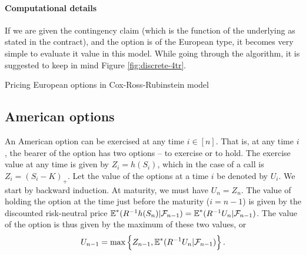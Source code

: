 \paragraph{Computational details}
If we are given the contingency claim (which is the function of the underlying as stated in the contract), and the option is of the European type, it becomes very simple to evaluate it value in this model. While going through the algorithm, it is suggested to keep in mind Figure \ref{fig:discrete-4tr}.

\begin{algorithm}[H]
	\DontPrintSemicolon
	
	
	
	
	\caption{Pricing European options in Cox-Ross-Rubinstein model}
	\label{alg:discrete-eu}
\end{algorithm}



\subsection{American options}

An American option can be exercised at any time $ i \in [n] $. That is, at any time $ i $, the bearer of the option has two options -- to exercise or to hold. The exercise value at any time is given by $ Z_i = h(S_i) $, which in the case of a call is $ Z_i = (S_i - K)_+ $. Let the value of the options at a time $ i $ be denoted by $ U_i $. We start by backward induction. At maturity, we must have $ U_n = Z_n $. The value of holding the option at the time just before the maturity ($ i = n-1 $) is given by the discounted risk-neutral price $ \operatorname{\mathbb{E}}^*( R^{-1} h(S_n) | \mathcal{F}_{n-1} ) = \operatorname{\mathbb{E}}^*( R^{-1} U_n | \mathcal{F}_{n-1} ) $. The value of the option is thus given by the maximum of these two values, or
\begin{equation}
	U_{n-1} = \max \left\lbrace Z_{n-1}, \operatorname{\mathbb{E}}^*( R^{-1} U_n | \mathcal{F}_{n-1} ) \right\rbrace .
\end{equation}

